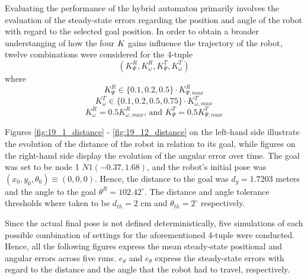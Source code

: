 Evaluating the performance of the hybrid automaton primarily involves the
evaluation of the steady-state errors regarding the position and angle of the
robot with regard to the selected goal position. In order to obtain a broader
understanging of how the four $K_{\*}$ gains influence the trajectory of the
robot, twelve combinations were considered for the 4-tuple
$$(K_{\Psi}^R, K_{\omega}^R, K_{\Psi}^T, K_{\omega}^T)$$
where
$$K_{\Psi}^R \in \{0.1,0.2,0.5\} \cdot K_{\Psi,max}^R$$
$$K_{\omega}^T \in \{0.1,0.2,0.5,0.75\} \cdot K_{\omega,max}^T$$
$$K_{\omega}^R = 0.5 K_{\omega,max}^R \text{, and } K_{\Psi}^T = 0.5 K_{\Psi,max}^T$$


Figures \ref{fig:19_1_distance} - \ref{fig:19_12_distance} on the left-hand side
illustrate the evolution of the distance of the robot in relation to its goal,
while figures on the right-hand side display the evolution of the angular
error over time. The goal was set to be node 1 $N1(-0.37, 1.68)$, and the
robot's initial pose was $(x_0, y_0, \theta_0) \equiv (0,0,0)$. Hence, the
distance to the goal was $d_g = 1.7203$ meters and the angle to the goal
$\theta^R = 102.42^{\circ}$. The distance and angle tolerance thresholds where
taken to be $d_{th} = 2\text{ cm}$ and $\theta_{th} = 2^{\circ}$ respectively.

Since the actual final pose is not defined deterministically, five simulations
of each possible combination of settings for the aforementioned 4-tuple were
conducted.  Hence, all the following figures express the mean steady-state
positional and angular errors across five runs. $e_d$ and $e_{\theta}$ express
the steady-state errors with regard to the distance and the angle that the robot
had to travel, respectively.

\noindent{}

